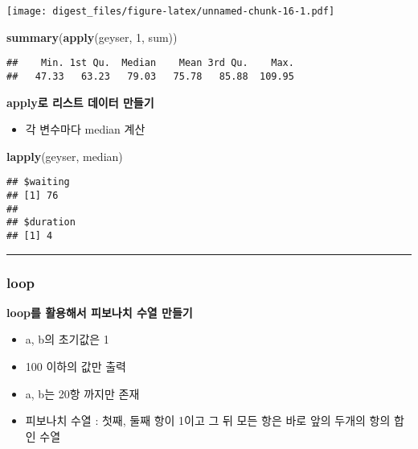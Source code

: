 \documentclass[]{article}
\newenvironment{Shaded}{\begin{snugshade}}{\end{snugshade}}
\newcommand{\KeywordTok}[1]{\textcolor[rgb]{0.13,0.29,0.53}{\textbf{#1}}}
\newcommand{\DecValTok}[1]{\textcolor[rgb]{0.00,0.00,0.81}{#1}}
\newcommand{\NormalTok}[1]{#1}
\providecommand{\tightlist}{%
  \setlength{\itemsep}{0pt}\setlength{\parskip}{0pt}}
\begin{document}
\texttt{[image: digest\_files/figure-latex/unnamed-chunk-16-1.pdf]}

\begin{Shaded}
\begin{Highlighting}[]
\KeywordTok{summary}\NormalTok{(}\KeywordTok{apply}\NormalTok{(geyser, }\DecValTok{1}\NormalTok{, sum))}
\end{Highlighting}
\end{Shaded}

\begin{verbatim}
##    Min. 1st Qu.  Median    Mean 3rd Qu.    Max. 
##   47.33   63.23   79.03   75.78   85.88  109.95
\end{verbatim}

\textbf{apply로 리스트 데이터 만들기}

\begin{itemize}
\tightlist
\item
  각 변수마다 median 계산
\end{itemize}

\begin{Shaded}
\begin{Highlighting}[]
\KeywordTok{lapply}\NormalTok{(geyser, median)}
\end{Highlighting}
\end{Shaded}

\begin{verbatim}
## $waiting
## [1] 76
## 
## $duration
## [1] 4
\end{verbatim}

\begin{center}\rule{0.5\linewidth}{\linethickness}\end{center}

\subsubsection{loop}\label{loop}

\textbf{loop를 활용해서 피보나치 수열 만들기}

\begin{itemize}
\tightlist
\item
  a, b의 초기값은 1
\item
  100 이하의 값만 출력
\item
  a, b는 20항 까지만 존재
\item
  피보나치 수열 : 첫째, 둘째 항이 1이고 그 뒤 모든 항은 바로 앞의 두개의
  항의 합인 수열
\end{itemize}
\end{document}
